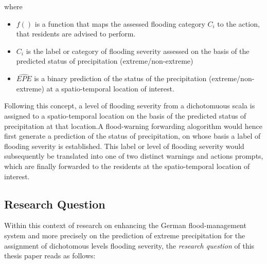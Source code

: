 \documentclass[
  12pt,
]{article}
\begin{document}
where

\begin{itemize}[label={}]
\item $f()$ is a function that maps the assessed flooding category $C_i$ to the action, that residents are advised to perform. 
\item $C_i$ is the label or category of flooding severity assessed on the basis of the predicted status of precipitation (extreme/non-extreme)
\item $\widehat{EPE}$ is a binary prediction of the status of the precipitation (extreme/non-extreme) at a spatio-temporal location of interest.
\end{itemize}

Following this concept, a level of flooding severity from a dichotomuous
scala is assigned to a spatio-temporal location on the basis of the
predicted status of precipitation at that location.\newline A
flood-warning forwarding alogorithm would hence first generate a
prediction of the status of precipitation, on whose basis a label of
flooding severity is established. This label or level of flooding
severity would subsequently be translated into one of two distinct
warnings and actions prompts, which are finally forwarded to the
residents at the spatio-temporal location of interest.

\hypertarget{research-question}{%
\subsection{Research Question}\label{research-question}}

Within this context of research on enhancing the German flood-management
system and more precisely on the prediction of extreme precipitation for
the assignment of dichotomous levels flooding severity, the
\textit{research question} of this thesis paper reads as follows:
\end{document}
